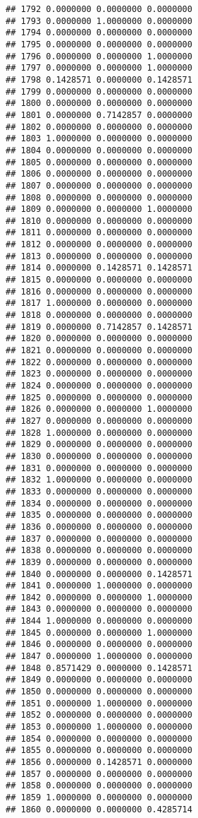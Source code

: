 \documentclass[
]{article}
\begin{document}
\begin{verbatim}
## 1792 0.0000000 0.0000000 0.0000000
## 1793 0.0000000 1.0000000 0.0000000
## 1794 0.0000000 0.0000000 0.0000000
## 1795 0.0000000 0.0000000 0.0000000
## 1796 0.0000000 0.0000000 1.0000000
## 1797 0.0000000 0.0000000 1.0000000
## 1798 0.1428571 0.0000000 0.1428571
## 1799 0.0000000 0.0000000 0.0000000
## 1800 0.0000000 0.0000000 0.0000000
## 1801 0.0000000 0.7142857 0.0000000
## 1802 0.0000000 0.0000000 0.0000000
## 1803 1.0000000 0.0000000 0.0000000
## 1804 0.0000000 0.0000000 0.0000000
## 1805 0.0000000 0.0000000 0.0000000
## 1806 0.0000000 0.0000000 0.0000000
## 1807 0.0000000 0.0000000 0.0000000
## 1808 0.0000000 0.0000000 0.0000000
## 1809 0.0000000 0.0000000 1.0000000
## 1810 0.0000000 0.0000000 0.0000000
## 1811 0.0000000 0.0000000 0.0000000
## 1812 0.0000000 0.0000000 0.0000000
## 1813 0.0000000 0.0000000 0.0000000
## 1814 0.0000000 0.1428571 0.1428571
## 1815 0.0000000 0.0000000 0.0000000
## 1816 0.0000000 0.0000000 0.0000000
## 1817 1.0000000 0.0000000 0.0000000
## 1818 0.0000000 0.0000000 0.0000000
## 1819 0.0000000 0.7142857 0.1428571
## 1820 0.0000000 0.0000000 0.0000000
## 1821 0.0000000 0.0000000 0.0000000
## 1822 0.0000000 0.0000000 0.0000000
## 1823 0.0000000 0.0000000 0.0000000
## 1824 0.0000000 0.0000000 0.0000000
## 1825 0.0000000 0.0000000 0.0000000
## 1826 0.0000000 0.0000000 1.0000000
## 1827 0.0000000 0.0000000 0.0000000
## 1828 1.0000000 0.0000000 0.0000000
## 1829 0.0000000 0.0000000 0.0000000
## 1830 0.0000000 0.0000000 0.0000000
## 1831 0.0000000 0.0000000 0.0000000
## 1832 1.0000000 0.0000000 0.0000000
## 1833 0.0000000 0.0000000 0.0000000
## 1834 0.0000000 0.0000000 0.0000000
## 1835 0.0000000 0.0000000 0.0000000
## 1836 0.0000000 0.0000000 0.0000000
## 1837 0.0000000 0.0000000 0.0000000
## 1838 0.0000000 0.0000000 0.0000000
## 1839 0.0000000 0.0000000 0.0000000
## 1840 0.0000000 0.0000000 0.1428571
## 1841 0.0000000 1.0000000 0.0000000
## 1842 0.0000000 0.0000000 1.0000000
## 1843 0.0000000 0.0000000 0.0000000
## 1844 1.0000000 0.0000000 0.0000000
## 1845 0.0000000 0.0000000 1.0000000
## 1846 0.0000000 0.0000000 0.0000000
## 1847 0.0000000 1.0000000 0.0000000
## 1848 0.8571429 0.0000000 0.1428571
## 1849 0.0000000 0.0000000 0.0000000
## 1850 0.0000000 0.0000000 0.0000000
## 1851 0.0000000 1.0000000 0.0000000
## 1852 0.0000000 0.0000000 0.0000000
## 1853 0.0000000 1.0000000 0.0000000
## 1854 0.0000000 0.0000000 0.0000000
## 1855 0.0000000 0.0000000 0.0000000
## 1856 0.0000000 0.1428571 0.0000000
## 1857 0.0000000 0.0000000 0.0000000
## 1858 0.0000000 0.0000000 0.0000000
## 1859 1.0000000 0.0000000 0.0000000
## 1860 0.0000000 0.0000000 0.4285714

\end{verbatim}
\end{document}
